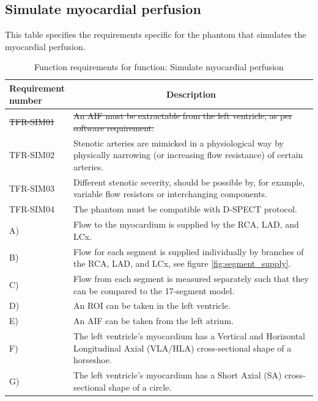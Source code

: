 \subsection{Simulate myocardial perfusion}
\begin{table} [H]
\caption{Function requirements for function: Simulate myocardial perfusion}
\label{tab:funcsim}
This table specifies the requirements specific for the phantom that simulates the myocardial perfusion.
\begin{tabular}{l|p{120mm}|}
	\makecell[l]{\textbf{Requirement} \\  \textbf{number}} & \multicolumn{1}{c}{\textbf{Description}}\\
	\hline
	\sout{TFR-SIM01} & \sout{An \ac{AIF} must be extractable from the left ventricle, as per software requirement.}\\
	TFR-SIM02 & Stenotic arteries are mimicked in a physiological way by physically narrowing (or increasing flow resistance) of certain arteries. \\
	TFR-SIM03 & Different stenotic severity, should be possible by, for example, variable flow resistors or interchanging components. \\
	TFR-SIM04 & The phantom must be compatible with D-SPECT protocol. \\
	\hspace{1.5cm} A) & Flow to the myocardium is supplied by the RCA, LAD, and LCx. \\
	\hspace{1.5cm} B) & Flow for each segment is supplied individually by branches of the RCA, LAD, and LCx, see figure \ref{fig:segment_supply}. \\
	\hspace{1.5cm} C) & Flow from each segment is measured separately such that they can be compared to the 17-segment model. \\
	\hspace{1.5cm} D) & An ROI can be taken in the left ventricle. \\
	\hspace{1.5cm} E) & An AIF can be taken from the left atrium. \\
	\hspace{1.5cm} F) & The left ventricle's myocardium has a Vertical and Horizontal Longitudinal Axial (VLA/HLA) cross-sectional shape of a horseshoe. \\
	\hspace{1.5cm} G) & The left ventricle's myocardium has a Short Axial (SA) cross-sectional shape of a circle. \\

\end{tabular}
\end{table}
